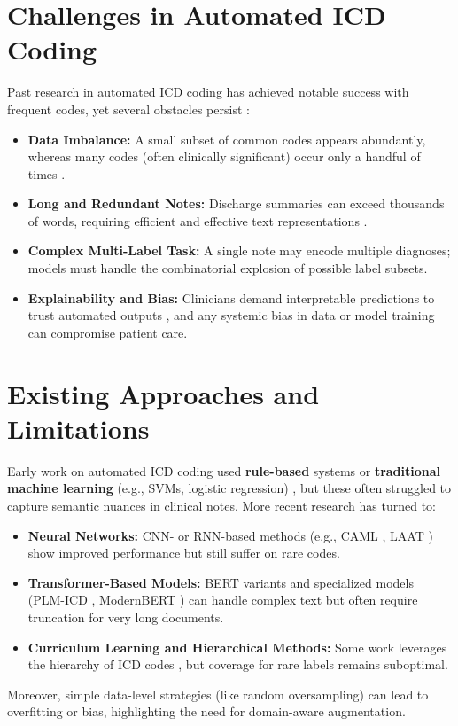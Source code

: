 \section{Challenges in Automated ICD Coding}
\label{sec:challenges-automated}
Past research in automated ICD coding has achieved notable success with frequent codes, yet several obstacles persist \cite{dong2022automated,edin2023automated}:
\begin{itemize}
    \item \textbf{Data Imbalance:} A small subset of common codes appears abundantly, whereas many codes (often clinically significant) occur only a handful of times \cite{rios2018few}.
    \item \textbf{Long and Redundant Notes:} Discharge summaries can exceed thousands of words, requiring efficient and effective text representations \cite{heo2022medical}.
    \item \textbf{Complex Multi-Label Task:} A single note may encode multiple diagnoses; models must handle the combinatorial explosion of possible label subsets.
    \item \textbf{Explainability and Bias:} Clinicians demand interpretable predictions to trust automated outputs \cite{holzinger2017we}, and any systemic bias in data or model training can compromise patient care.
\end{itemize}

\section{Existing Approaches and Limitations}
Early work on automated ICD coding used \textbf{rule-based} systems \cite{farkas2008automatic} or \textbf{traditional machine learning} (e.g., SVMs, logistic regression) \cite{perotte2014diagnosis}, but these often struggled to capture semantic nuances in clinical notes. More recent research has turned to:
\begin{itemize}
    \item \textbf{Neural Networks:} CNN- or RNN-based methods (e.g., CAML \cite{mullenbach2018explainable}, LAAT \cite{vu2020label}) show improved performance but still suffer on rare codes.
    \item \textbf{Transformer-Based Models:} BERT variants \cite{devlin2019bert} and specialized models (PLM-ICD \cite{huang2022plm}, ModernBERT \cite{warner2024modernbert}) can handle complex text but often require truncation for very long documents.
    \item \textbf{Curriculum Learning and Hierarchical Methods:} Some work leverages the hierarchy of ICD codes \cite{ren2022hicu}, but coverage for rare labels remains suboptimal.
\end{itemize}
Moreover, simple data-level strategies (like random oversampling) can lead to overfitting or bias, highlighting the need for domain-aware augmentation.

